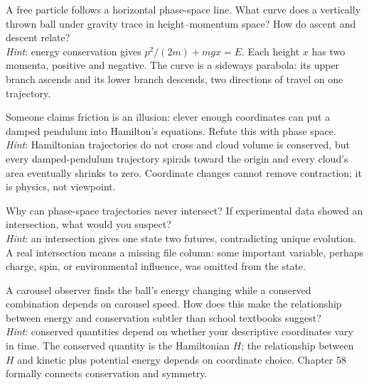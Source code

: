 \begin{puzzles}
\item A free particle follows a horizontal phase-space line. What curve does a vertically thrown ball under gravity trace in height--momentum space? How do ascent and descent relate?\\
\emph{Hint}: energy conservation gives \(p^{2}/(2m)+mgx=E\). Each height \(x\) has two momenta, positive and negative. The curve is a sideways parabola: its upper branch ascends and its lower branch descends, two directions of travel on one trajectory.
\item Someone claims friction is an illusion: clever enough coordinates can put a damped pendulum into Hamilton's equations. Refute this with phase space.\\
\emph{Hint}: Hamiltonian trajectories do not cross and cloud volume is conserved, but every damped-pendulum trajectory spirals toward the origin and every cloud's area eventually shrinks to zero. Coordinate changes cannot remove contraction; it is physics, not viewpoint.
\item Why can phase-space trajectories never intersect? If experimental data showed an intersection, what would you suspect?\\
\emph{Hint}: an intersection gives one state two futures, contradicting unique evolution. A real intersection means a missing file column: some important variable, perhaps charge, spin, or environmental influence, was omitted from the state.
\item A carousel observer finds the ball's energy changing while a conserved combination depends on carousel speed. How does this make the relationship between energy and conservation subtler than school textbooks suggest?\\
\emph{Hint}: conserved quantities depend on whether your descriptive coordinates vary in time. The conserved quantity is the Hamiltonian \(H\); the relationship between \(H\) and kinetic plus potential energy depends on coordinate choice. Chapter 58 formally connects conservation and symmetry.
\end{puzzles}
